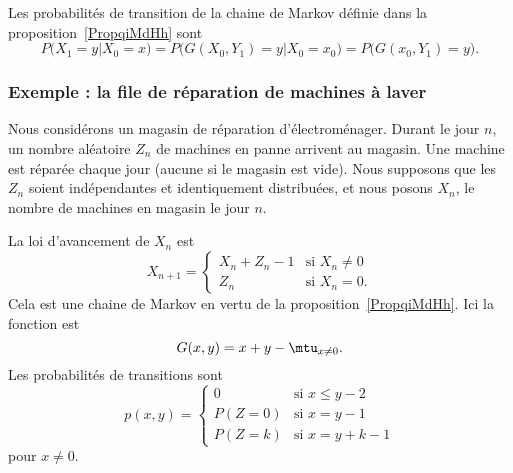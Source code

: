 Les probabilités de transition de la chaine de Markov définie dans la proposition~\ref{PropqiMdHh} sont
\begin{equation}
	P(X_1=y|X_0=x)=P\big( G(X_0,Y_1)=y|X_0=x_0 \big)=P\big( G(x_0,Y_1)=y \big).
\end{equation}

\subsubsection{Exemple : la file de réparation de machines à laver}

Nous considérons un magasin de réparation d'électroménager. Durant le jour \( n\), un nombre aléatoire \( Z_{n}\) de machines en panne arrivent au magasin. Une machine est réparée chaque jour (aucune si le magasin est vide). Nous supposons que les \( Z_n\) soient indépendantes et identiquement distribuées, et nous posons \( X_n\), le nombre de machines en magasin le jour \( n\).

La loi d'avancement de \( X_n\) est
\begin{equation}
	X_{n+1}=\begin{cases}
		X_n+Z_n-1 & \text{si } X_n\neq 0 \\
		Z_n       & \text{si } X_n=0.
	\end{cases}
\end{equation}
Cela est une chaine de Markov en vertu de la proposition~\ref{PropqiMdHh}. Ici la fonction est
\begin{equation}
	G(x,y)=x+y-\mtu_{x\neq 0}.
\end{equation}
Les probabilités de transitions sont
\begin{equation}
	p(x,y)=\begin{cases}
		0      & \text{si } x\leq y-2 \\
		P(Z=0) & \text{si } x=y-1     \\
		P(Z=k) & \text{si } x=y+k-1
	\end{cases}
\end{equation}
pour \( x\neq 0\).


